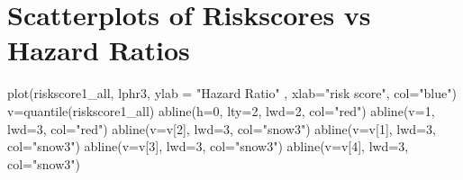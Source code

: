 \documentclass[
  11pt,
]{article}
\newenvironment{Shaded}{\begin{snugshade}}{\end{snugshade}}
\newcommand{\AttributeTok}[1]{\textcolor[rgb]{0.77,0.63,0.00}{#1}}
\newcommand{\DecValTok}[1]{\textcolor[rgb]{0.00,0.00,0.81}{#1}}
\newcommand{\FunctionTok}[1]{\textcolor[rgb]{0.00,0.00,0.00}{#1}}
\newcommand{\NormalTok}[1]{#1}
\newcommand{\OtherTok}[1]{\textcolor[rgb]{0.56,0.35,0.01}{#1}}
\newcommand{\StringTok}[1]{\textcolor[rgb]{0.31,0.60,0.02}{#1}}
\begin{document}
\newpage
\section{Scatterplots of Riskscores vs Hazard Ratios}

\begin{Shaded}
\begin{Highlighting}[]
\FunctionTok{plot}\NormalTok{(riskscore1\_all, lphr3, }\AttributeTok{ylab =} \StringTok{"Hazard Ratio"}\NormalTok{ ,}
     \AttributeTok{xlab=}\StringTok{"risk score"}\NormalTok{, }\AttributeTok{col=}\StringTok{"blue"}\NormalTok{)}
\NormalTok{v}\OtherTok{=}\FunctionTok{quantile}\NormalTok{(riskscore1\_all)}
\FunctionTok{abline}\NormalTok{(}\AttributeTok{h=}\DecValTok{0}\NormalTok{, }\AttributeTok{lty=}\DecValTok{2}\NormalTok{, }\AttributeTok{lwd=}\DecValTok{2}\NormalTok{, }\AttributeTok{col=}\StringTok{"red"}\NormalTok{)}
\FunctionTok{abline}\NormalTok{(}\AttributeTok{v=}\DecValTok{1}\NormalTok{, }\AttributeTok{lwd=}\DecValTok{3}\NormalTok{, }\AttributeTok{col=}\StringTok{"red"}\NormalTok{)}
\FunctionTok{abline}\NormalTok{(}\AttributeTok{v=}\NormalTok{v[}\DecValTok{2}\NormalTok{], }\AttributeTok{lwd=}\DecValTok{3}\NormalTok{, }\AttributeTok{col=}\StringTok{"snow3"}\NormalTok{)}
\FunctionTok{abline}\NormalTok{(}\AttributeTok{v=}\NormalTok{v[}\DecValTok{1}\NormalTok{], }\AttributeTok{lwd=}\DecValTok{3}\NormalTok{, }\AttributeTok{col=}\StringTok{"snow3"}\NormalTok{)}
\FunctionTok{abline}\NormalTok{(}\AttributeTok{v=}\NormalTok{v[}\DecValTok{3}\NormalTok{], }\AttributeTok{lwd=}\DecValTok{3}\NormalTok{, }\AttributeTok{col=}\StringTok{"snow3"}\NormalTok{)}
\FunctionTok{abline}\NormalTok{(}\AttributeTok{v=}\NormalTok{v[}\DecValTok{4}\NormalTok{], }\AttributeTok{lwd=}\DecValTok{3}\NormalTok{, }\AttributeTok{col=}\StringTok{"snow3"}\NormalTok{)}
\end{Highlighting}
\end{Shaded}
\end{document}
